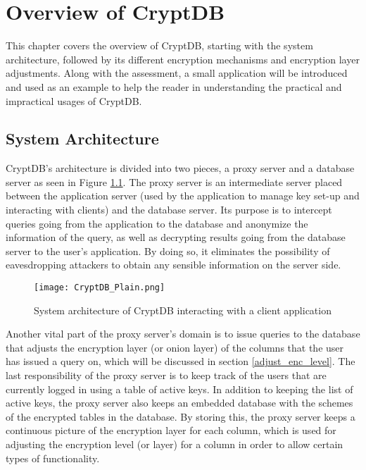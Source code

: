 \chapter{Overview of CryptDB}
\label{chp:overview_cryptDB}

This chapter covers the overview of CryptDB, starting with the system architecture, followed by its different encryption mechanisms and encryption layer adjustments. Along with the assessment, a small application will be introduced and used as an example to help the reader in understanding the practical and impractical usages of CryptDB.

\section{System Architecture}
\label{sec:sysarc}

CryptDB's architecture is divided into two pieces, a proxy server and a database server as seen in Figure \ref{cryptdb_plain}. The proxy server is an intermediate server placed between the application server (used by the application to manage key set-up and interacting with clients) and the database server. Its purpose is to intercept queries going from the application to the database and anonymize the information of the query, as well as decrypting results going from the database server to the user's application. By doing so, it eliminates the possibility of eavesdropping attackers to obtain any sensible information on the server side. %

\begin{figure}[H]
	\texttt{[image: CryptDB\_Plain.png]}
	\caption{System architecture of CryptDB interacting with a client application}
	\label{cryptdb_plain}
\end{figure}

Another vital part of the proxy server's domain is to issue queries to the database that adjusts the encryption layer (or onion layer) of the columns that the user has issued a query on, which will be discussed in section \ref{adjust_enc_level}. The last responsibility of the proxy server is to keep track of the users that are currently logged in using a table of active keys. In addition to keeping the list of active keys, the proxy server also keeps an embedded database with the schemes of the encrypted tables in the database. By storing this, the proxy server keeps a continuous picture of the encryption layer for each column, which is used for adjusting the encryption level (or layer) for a column in order to allow certain types of functionality.

